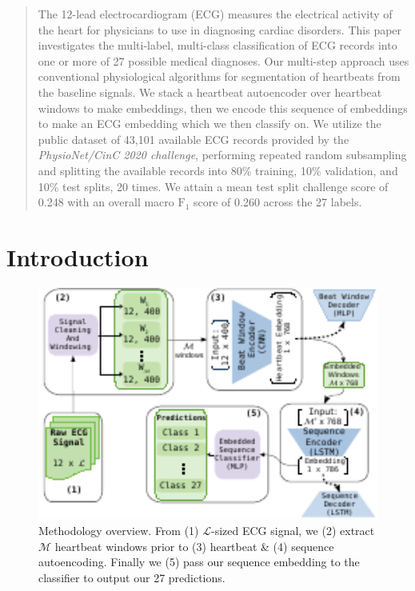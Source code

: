 \documentclass[\main/thesis.tex]{subfiles}
\begin{document}
\begin{abstract}
The 12-lead electrocardiogram (ECG) measures the electrical activity of the heart for physicians to use in diagnosing cardiac disorders.
This paper investigates the multi-label, multi-class classification of ECG records into one or more of 27 possible medical diagnoses.
Our multi-step approach uses conventional physiological algorithms for segmentation of heartbeats from the baseline signals.
We stack a heartbeat autoencoder over heartbeat windows to make embeddings, then we encode this sequence of embeddings to make an ECG embedding which we then classify on.
We utilize the public dataset of 43,101 available ECG records provided by the \emph{PhysioNet/CinC 2020 challenge}, performing repeated random subsampling and splitting the available records into 80\% training, 10\% validation, and 10\% test splits, 20 times.
We attain a mean test split challenge score of 0.248 with an overall macro $\text{F}_1$ score of 0.260 across the 27 labels.
\end{abstract}
%
%
\section{Introduction}

\begin{figure}[t]
    \centering
    \includegraphics[width=14cm]{figure/aenc_methodology.pdf}
    \caption{Methodology overview. From (1) $\mathcal{L}$-sized ECG signal, we (2) extract $\mathcal{M}$ heartbeat windows prior to (3) heartbeat \& (4) sequence autoencoding. Finally we (5) pass our sequence embedding to the classifier to output our 27 predictions.}
    \label{fig:aenc_methodology}
\end{figure}
\end{document}
